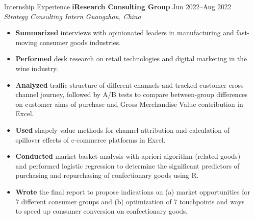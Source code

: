 \documentclass{resume} %
\begin{document}
\begin{rSection}{Internship Experience}
\textbf{iResearch Consulting Group} \hfill Jun 2022--Aug 2022 \\
\textit{Strategy Consulting Intern} \hfill \textit{Guangzhou, China}
 \begin{itemize}
    \itemsep -5pt {} 
    \item \textbf{Summarized} interviews with opinionated leaders in manufacturing and fast-moving consumer goods industries.
    \item \textbf{Performed} desk research on retail technologies and digital marketing in the wine industry.
    \item \textbf{Analyzed} traffic structure of different channels and tracked customer cross-channel journey, followed by A/B tests to compare between-group differences on customer aims of purchase and Gross Merchandise Value contribution in Excel. 
    \item \textbf{Used} shapely value methods for channel attribution and calculation of spillover effects of e-commerce platforms in Excel.
    \item \textbf{Conducted} market basket analysis with apriori algorithm (related goods) and performed logistic regression to determine the significant predictors of purchasing and repurchasing of confectionary goods using R.  
    \item \textbf{Wrote} the final report to propose indications on (a) market opportunities for 7 different consumer groups and (b) optimization of 7 touchpoints and ways to speed up consumer conversion on confectionary goods.
 \end{itemize}
\end{rSection} 
\end{document}
